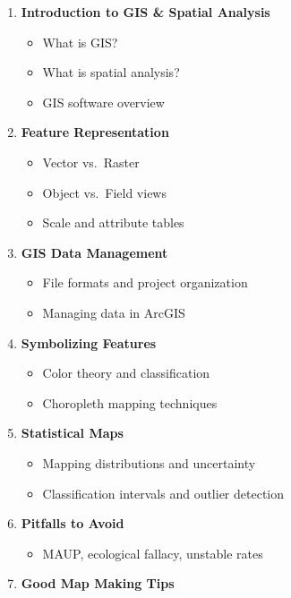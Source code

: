 \documentclass[
  letterpaper,
]{book}
\providecommand{\tightlist}{%
  \setlength{\itemsep}{0pt}\setlength{\parskip}{0pt}}
\begin{document}
\begin{enumerate}
\def\labelenumi{\arabic{enumi}.}
\tightlist
\item
  \textbf{Introduction to GIS \& Spatial Analysis}

  \begin{itemize}
  \tightlist
  \item
    What is GIS?
  \item
    What is spatial analysis?
  \item
    GIS software overview
  \end{itemize}
\item
  \textbf{Feature Representation}

  \begin{itemize}
  \tightlist
  \item
    Vector vs.~Raster
  \item
    Object vs.~Field views
  \item
    Scale and attribute tables
  \end{itemize}
\item
  \textbf{GIS Data Management}

  \begin{itemize}
  \tightlist
  \item
    File formats and project organization
  \item
    Managing data in ArcGIS
  \end{itemize}
\item
  \textbf{Symbolizing Features}

  \begin{itemize}
  \tightlist
  \item
    Color theory and classification
  \item
    Choropleth mapping techniques
  \end{itemize}
\item
  \textbf{Statistical Maps}

  \begin{itemize}
  \tightlist
  \item
    Mapping distributions and uncertainty
  \item
    Classification intervals and outlier detection
  \end{itemize}
\item
  \textbf{Pitfalls to Avoid}

  \begin{itemize}
  \tightlist
  \item
    MAUP, ecological fallacy, unstable rates
  \end{itemize}
\item
  \textbf{Good Map Making Tips}


\end{enumerate}
\end{document}
